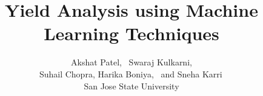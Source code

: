 %
%






\documentclass[journal]{IEEEtran}

\usepackage{xcolor,soul,framed} %

\usepackage[pdftex]{graphicx}
\graphicspath{{../pdf/}{../jpeg/}}
\usepackage{graphicx}
\usepackage[cmex10]{amsmath}
\usepackage{array}
\usepackage{mdwmath}
\usepackage{mdwtab}
\usepackage{eqparbox}
\usepackage{url}
\usepackage{hyperref}






    \title{Yield Analysis using Machine Learning Techniques}
  \author{Akshat Patel,~\IEEEmembership{}
      Swaraj Kulkarni,{}\\
      Suhail Chopra,{}
      Harika Boniya,~\IEEEmembership{}
      and Sneha Karri\,\\{San Jose State University}%

  }




\maketitle



